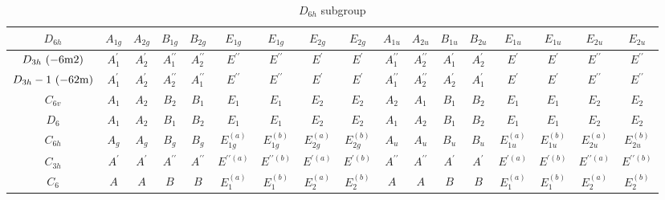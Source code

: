 \documentclass[fleqn,10pt,landscape]{jsarticle}
\begin{document}
\begin{table}[ht!]
\begin{center}
\caption{$D_{6h}$ subgroup}
\renewcommand{\arraystretch}{1.0}
\begin{tabular}{ccccccccccccccccc} \hline \hline
$ D_{6h} $ & $ A_{1g} $ & $ A_{2g} $ & $ B_{1g} $ & $ B_{2g} $ & $ E_{1g} $ & $ E_{1g} $ & $ E_{2g} $ & $ E_{2g} $ & $ A_{1u} $ & $ A_{2u} $ & $ B_{1u} $ & $ B_{2u} $ & $ E_{1u} $ & $ E_{1u} $ & $ E_{2u} $ & $ E_{2u} $ \\ \hline
$ D_{3h}\,\, ({\rm -6m2}) $ & $ A_{1}^{\prime} $ & $ A_{2}^{\prime} $ & $ A_{1}^{\prime\prime} $ & $ A_{2}^{\prime\prime} $ & $ E^{\prime\prime} $ & $ E^{\prime\prime} $ & $ E^{\prime} $ & $ E^{\prime} $ & $ A_{1}^{\prime\prime} $ & $ A_{2}^{\prime\prime} $ & $ A_{1}^{\prime} $ & $ A_{2}^{\prime} $ & $ E^{\prime} $ & $ E^{\prime} $ & $ E^{\prime\prime} $ & $ E^{\prime\prime} $ \\
$ D_{3h}-1\,\, ({\rm -62m}) $ & $ A_{1}^{\prime} $ & $ A_{2}^{\prime} $ & $ A_{2}^{\prime\prime} $ & $ A_{1}^{\prime\prime} $ & $ E^{\prime\prime} $ & $ E^{\prime\prime} $ & $ E^{\prime} $ & $ E^{\prime} $ & $ A_{1}^{\prime\prime} $ & $ A_{2}^{\prime\prime} $ & $ A_{2}^{\prime} $ & $ A_{1}^{\prime} $ & $ E^{\prime} $ & $ E^{\prime} $ & $ E^{\prime\prime} $ & $ E^{\prime\prime} $ \\
$ C_{6v} $ & $ A_{1} $ & $ A_{2} $ & $ B_{2} $ & $ B_{1} $ & $ E_{1} $ & $ E_{1} $ & $ E_{2} $ & $ E_{2} $ & $ A_{2} $ & $ A_{1} $ & $ B_{1} $ & $ B_{2} $ & $ E_{1} $ & $ E_{1} $ & $ E_{2} $ & $ E_{2} $ \\
$ D_{6} $ & $ A_{1} $ & $ A_{2} $ & $ B_{1} $ & $ B_{2} $ & $ E_{1} $ & $ E_{1} $ & $ E_{2} $ & $ E_{2} $ & $ A_{1} $ & $ A_{2} $ & $ B_{1} $ & $ B_{2} $ & $ E_{1} $ & $ E_{1} $ & $ E_{2} $ & $ E_{2} $ \\
$ C_{6h} $ & $ A_{g} $ & $ A_{g} $ & $ B_{g} $ & $ B_{g} $ & $ E_{1g}^{(a)} $ & $ E_{1g}^{(b)} $ & $ E_{2g}^{(a)} $ & $ E_{2g}^{(b)} $ & $ A_{u} $ & $ A_{u} $ & $ B_{u} $ & $ B_{u} $ & $ E_{1u}^{(a)} $ & $ E_{1u}^{(b)} $ & $ E_{2u}^{(a)} $ & $ E_{2u}^{(b)} $ \\
$ C_{3h} $ & $ A^{\prime} $ & $ A^{\prime} $ & $ A^{\prime\prime} $ & $ A^{\prime\prime} $ & $ E^{\prime\prime(a)} $ & $ E^{\prime\prime(b)} $ & $ E^{\prime(a)} $ & $ E^{\prime(b)} $ & $ A^{\prime\prime} $ & $ A^{\prime\prime} $ & $ A^{\prime} $ & $ A^{\prime} $ & $ E^{\prime(a)} $ & $ E^{\prime(b)} $ & $ E^{\prime\prime(a)} $ & $ E^{\prime\prime(b)} $ \\
$ C_{6} $ & $ A $ & $ A $ & $ B $ & $ B $ & $ E_{1}^{(a)} $ & $ E_{1}^{(b)} $ & $ E_{2}^{(a)} $ & $ E_{2}^{(b)} $ & $ A $ & $ A $ & $ B $ & $ B $ & $ E_{1}^{(a)} $ & $ E_{1}^{(b)} $ & $ E_{2}^{(a)} $ & $ E_{2}^{(b)} $ \\

\end{tabular}
\end{center}
\end{table}
\end{document}
